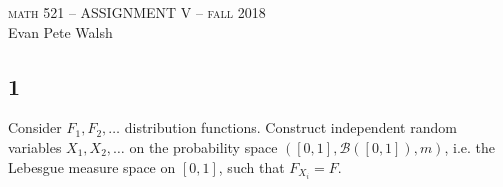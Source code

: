 \documentclass[12pt]{article}
\begin{document}
\thispagestyle{empty}
\begin{center}
  \Large \textsc{math 521 -- ASSIGNMENT V -- fall 2018} \\ 
  \vspace{5mm}
  \large Evan Pete Walsh
\end{center}


\subsection*{1}
\begin{tcolorbox}
  Consider $F_1, F_2, \dots$ distribution functions. Construct independent random variables $X_1, X_2, \dots$ on the probability space $([0, 1], \mathcal{B}([0,1]), m)$, i.e. the Lebesgue measure space on $[0,1]$, such that $F_{X_i} = F$.
\end{tcolorbox}
\end{document}
